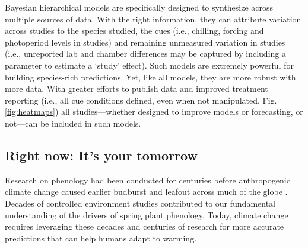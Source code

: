 \documentclass[11pt,letter]{article}
\begin{document}
Bayesian hierarchical models are specifically designed to synthesize across multiple sources of data. With the right information, they can attribute variation across studies to the species studied, the cues (i.e., chilling, forcing and photoperiod levels in studies) and remaining unmeasured variation in studies (i.e., unreported lab and chamber differences may be captured by including a parameter to estimate a `study' effect). Such models are extremely powerful for building species-rich predictions. Yet, like all models, they are more robust with more data. With greater efforts to publish data and improved treatment reporting (i.e., all cue conditions defined, even when not manipulated, Fig. \ref{fig:heatmaps}) all studies---whether designed to improve models or forecasting, or not---can be included in such models. 



\subsection{Right now: It's your tomorrow}
Research on phenology had been conducted for centuries before anthropogenic climate change caused earlier budburst and leafout across much of the globe \citep{Lamb:1948aa,Sparks:1995mv}. Decades of controlled environment studies contributed to our fundamental understanding of the drivers of spring plant phenology. Today, climate change requires leveraging these decades and centuries of research for more accurate predictions that can help humans adapt to warming. \\
\end{document}
